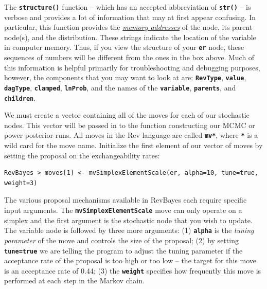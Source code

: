 \documentclass[11pt]{article}
\newcommand{\cl}[1]{{\texttt{\textbf{#1}}}}
\begin{document}
The \cl{structure()} function -- which has an accepted abbreviation of \cl{str()} -- is verbose and provides a lot of information that may at first appear confusing. 
In particular, this function provides the \href{http://en.wikipedia.org/wiki/Memory_address}{\textit{memory addresses}} of the node, its parent node(s), and the distribution. 
These strings indicate the location of the variable in computer memory. 
Thus, if you view the structure of your \cl{er} node, these sequences of numbers will be different from the ones in the box above. 
Much of this information is helpful primarily for troubleshooting and debugging purposes, however, the components that you may want to look at are: \cl{RevType}, \cl{value}, \cl{dagType}, \cl{clamped}, \cl{lnProb}, and the names of the \cl{variable}, \cl{parents}, and \cl{children}.

We must create a vector containing all of the moves for each of our stochastic nodes. 
This vector will be passed in to the function constructing our MCMC or power posterior runs.
All moves in the Rev language are called \cl{mv*}, where \cl{*} is a wild card for the move name. 
Initialize the first element of our vector of moves by setting the proposal on the exchangeability rates:

{\tt\small \begin{snugshade*}
\begin{lstlisting}
RevBayes > moves[1] <- mvSimplexElementScale(er, alpha=10, tune=true, weight=3) 
\end{lstlisting}
\end{snugshade*}}


The various proposal mechanisms available in RevBayes each require specific input arguments. 
The \cl{mvSimplexElementScale} move can only operate on a simplex and the first argument is the stochastic node that you wish to update. 
The variable node is followed by three more arguments: (1) \cl{alpha} is the \textit{tuning parameter} of the move and controls the size of the proposal; (2) by setting \cl{tune=true} we are telling the program to adjust the tuning parameter if the acceptance rate of the proposal is too high or too low -- the target for this move is an acceptance rate of 0.44; (3) the \cl{weight} specifies how frequently this move is performed at each step in the Markov chain. 
\end{document}

